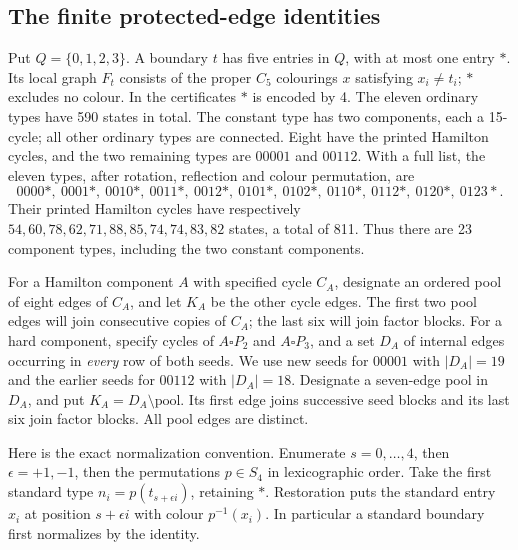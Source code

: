\documentclass[11pt]{article}
\theoremstyle{remark}
\numberwithin{equation}{section}
\begin{document}
\subsection{The finite protected-edge identities}
Put $Q=\{0,1,2,3\}$. A boundary $t$ has five entries in $Q$, with at most
one entry $\ast$. Its local graph $F_t$ consists of the proper $C_5$
colourings $x$ satisfying $x_i\ne t_i$; $\ast$ excludes no colour.
In the certificates $\ast$ is encoded by 4.
The eleven ordinary types have 590 states in total.
The constant type has two components, each a 15-cycle; all other
ordinary types are connected. Eight have the printed Hamilton cycles,
and the two remaining types are $00001$ and $00112$.
With a full list, the eleven types, after rotation, reflection and
colour permutation, are
\[
0000\ast,\ 0001\ast,\ 0010\ast,\ 0011\ast,\ 0012\ast,\
0101\ast,\ 0102\ast,\ 0110\ast,\ 0112\ast,\ 0120\ast,\ 0123\ast.
\]
Their printed Hamilton cycles have respectively
$54,60,78,62,71,88,85,74,74,83,82$ states, a total of 811.
Thus there are 23 component types, including the two constant components.

For a Hamilton component $A$ with specified cycle $C_A$, designate an
ordered pool of eight edges of $C_A$, and let $K_A$ be the other cycle
edges. The first two pool edges will join consecutive copies of $C_A$;
the last six will join factor blocks.
For a hard component, specify cycles of $A\square P_2$ and
$A\square P_3$, and a set $D_A$ of internal edges occurring in
\emph{every} row of both seeds. We use new seeds for $00001$ with
$|D_A|=19$ and the earlier seeds for $00112$ with $|D_A|=18$.
Designate a seven-edge pool in $D_A$, and put $K_A=D_A\setminus
\text{pool}$. Its first edge joins successive seed blocks and its last
six join factor blocks. All pool edges are distinct.

Here is the exact normalization convention. Enumerate $s=0,\ldots,4$,
then $\epsilon=+1,-1$, then the permutations $p\in S_4$ in lexicographic
order. Take the first standard type
$n_i=p(t_{s+\epsilon i})$, retaining $\ast$. Restoration puts the
standard entry $x_i$ at position $s+\epsilon i$ with colour $p^{-1}(x_i)$.
In particular a standard boundary first normalizes by the identity.
\end{document}
